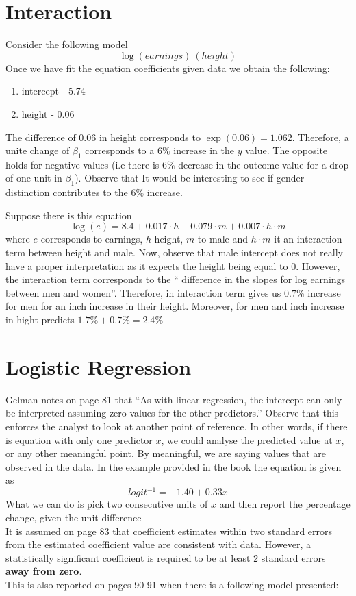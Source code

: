 \documentclass{article}
\begin{document}
\section{Interaction}

Consider the following model
\begin{equation}
\log( earnings ) ~ (height)
\end{equation}
Once we have fit the equation coefficients given data we obtain the following:
\begin{enumerate}
\item intercept - 5.74
\item height - 0.06
\end{enumerate}
The difference of $0.06$ in height corresponds to $\exp(0.06)=1.062$. Therefore, a unite change of $\beta_1$ corresponds to a $6\%$ increase in the $y$ value. The opposite holds for negative values (i.e there is $6\%$ decrease in the outcome value for a drop of one unit in $\beta_1$). Observe that It would be interesting to see if gender distinction contributes to the $6\%$ increase.

Suppose there is this equation
\begin{equation}
\log(e) = 8.4+0.017 \cdot h - 0.079 \cdot m + 0.007 \cdot h \cdot m 
\end{equation}
where $e$ corresponds to earnings, $h$ height, $m$ to male and $h \cdot m $ it an interaction term between height and male. Now, observe that male intercept does not really have a proper interpretation as it expects the height being equal to 0. However, the interaction term corresponds to the `` difference in the slopes for log earnings between men and women''. Therefore, in interaction term gives us $0.7\%$ increase for men for an inch increase in their height. Moreover, for men and inch increase in hight predicts $1.7\% + 0.7\% = 2.4\%$

\section{Logistic Regression}
Gelman notes on page 81 that ``As with linear regression, the intercept can only be interpreted assuming zero values for the other predictors.'' Observe that this enforces the analyst to look at another point of reference. In other words, if there is equation with only one predictor $x$, we could analyse the predicted value at $\bar{x}$, or any other meaningful point. By meaningful, we are saying values that are observed in the data. In the example provided in the book the equation is given as 
\begin{equation}
logit^{-1} = -1.40 + 0.33x
\end{equation}
What we can do is pick two consecutive units of $x$ and then report the percentage change, given the unit difference
\\
\indent
It is assumed on page 83 that coefficient estimates within two standard errors from the estimated coefficient value are consistent with data. However, a statistically significant coefficient is required to be at least 2 standard errors \textbf{away from zero}.
\\
\indent
This is also reported on pages 90-91 when there is a following model presented:
\end{document}
